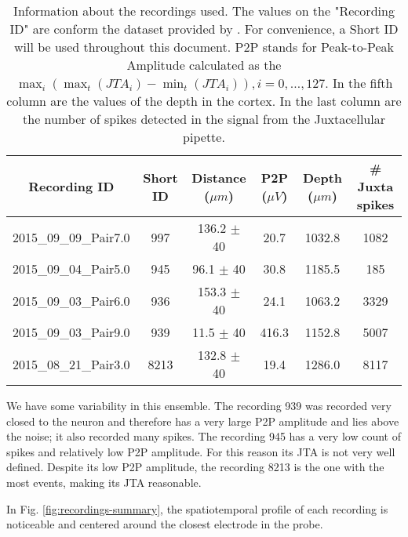 \begin{table}[!h]
\centering
\begin{tabular}{|c|c|c|c|c|c|}
\hline
\textbf{Recording ID} & \textbf{Short ID} & \textbf{Distance ($\mu m$) } & \textbf{P2P ($\mu V$)} & \textbf{Depth ($\mu m$)} & \textbf{\# Juxta spikes}\\ \hline
2015\_09\_09\_Pair7.0 & 997 & 136.2 $\pm$ 40 & 20.7 & 1032.8 & 1082  \\ \hline
2015\_09\_04\_Pair5.0 & 945 & 96.1 $\pm$ 40 & 30.8 & 1185.5 & 185  \\ \hline
2015\_09\_03\_Pair6.0 & 936 & 153.3 $\pm$  40 & 24.1 & 1063.2 & 3329 \\ \hline
2015\_09\_03\_Pair9.0 & 939 & 11.5 $\pm$  40 & 416.3 & 1152.8 & 5007  \\ \hline
2015\_08\_21\_Pair3.0 & 8213 & 132.8 $\pm$ 40 & 19.4 & 1286.0 & 8117 \\ \hline
\end{tabular}
\caption{Information about the recordings used. The values on the "Recording ID" are conform the dataset provided by \cite{Netoetal}. For convenience, a Short ID will be used throughout this document. P2P stands for Peak-to-Peak Amplitude calculated as the $\max_i \left( \max_t \left( JTA_i \right) - \min_t \left( JTA_i \right)\right), i=0,\ldots , 127$. In the fifth column are the values of the depth in the cortex. In the last column are the number of spikes detected in the signal from the Juxtacellular pipette.}
\label{tab:sum-recordings}
\end{table}

We have some variability in this ensemble. 
The recording 939 was recorded very closed to the neuron and therefore has a very large P2P amplitude and lies above the noise; it also recorded many spikes. 
The recording 945 has a very low count of spikes and relatively low P2P amplitude. For this reason its JTA is not very well defined.
Despite its low P2P amplitude, the recording 8213 is the one with the most events, making its JTA reasonable.

In Fig. \ref{fig:recordings-summary}, the spatiotemporal profile of each recording is noticeable and centered around the closest electrode in the probe.
